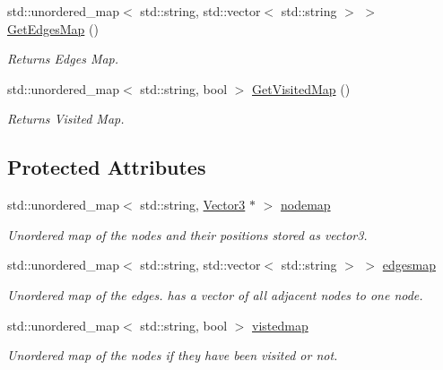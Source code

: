 \begin{DoxyCompactItemize}
std\+::unordered\+\_\+map$<$ std\+::string, std\+::vector$<$ std\+::string $>$ $>$ \hyperlink{classSearchStrategy_af95de6417f719214be12f4678dd48b6d}{Get\+Edges\+Map} ()
\begin{DoxyCompactList}\small\item\em Returns Edges Map. \end{DoxyCompactList}\item 
\mbox{\label{classSearchStrategy_ad46318019cfa5b1b9097f39be01f059c}} 
std\+::unordered\+\_\+map$<$ std\+::string, bool $>$ \hyperlink{classSearchStrategy_ad46318019cfa5b1b9097f39be01f059c}{Get\+Visited\+Map} ()
\begin{DoxyCompactList}\small\item\em Returns Visited Map. \end{DoxyCompactList}\end{DoxyCompactItemize}
\subsection*{Protected Attributes}
\begin{DoxyCompactItemize}
\item 
\mbox{\label{classSearchStrategy_a5cb541743b9802dafd26c98bde3d9473}} 
std\+::unordered\+\_\+map$<$ std\+::string, \hyperlink{classVector3}{Vector3} $\ast$ $>$ \hyperlink{classSearchStrategy_a5cb541743b9802dafd26c98bde3d9473}{nodemap}
\begin{DoxyCompactList}\small\item\em Unordered map of the nodes and their positions stored as vector3. \end{DoxyCompactList}\item 
\mbox{\label{classSearchStrategy_a31e33ffc2c0b8a0f0cb9c346860d7567}} 
std\+::unordered\+\_\+map$<$ std\+::string, std\+::vector$<$ std\+::string $>$ $>$ \hyperlink{classSearchStrategy_a31e33ffc2c0b8a0f0cb9c346860d7567}{edgesmap}
\begin{DoxyCompactList}\small\item\em Unordered map of the edges. has a vector of all adjacent nodes to one node. \end{DoxyCompactList}\item 
\mbox{\label{classSearchStrategy_af5d0b8c9e35fca03d26b66e6019b1464}} 
std\+::unordered\+\_\+map$<$ std\+::string, bool $>$ \hyperlink{classSearchStrategy_af5d0b8c9e35fca03d26b66e6019b1464}{vistedmap}
\begin{DoxyCompactList}\small\item\em Unordered map of the nodes if they have been visited or not. \end{DoxyCompactList}\end{DoxyCompactItemize}



